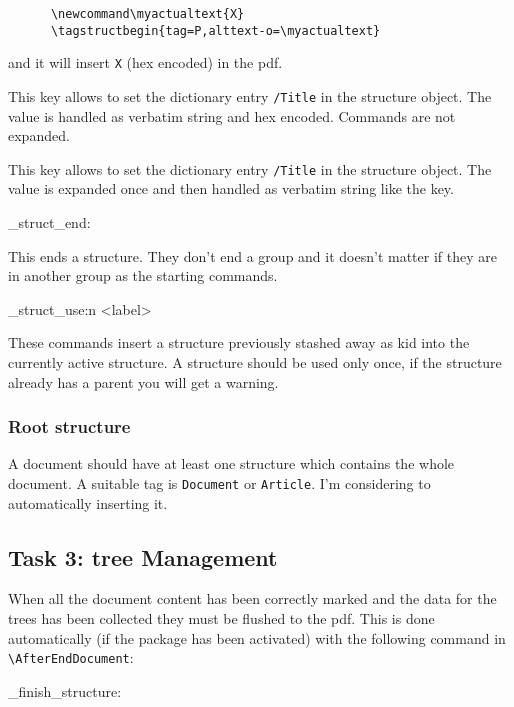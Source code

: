 \documentclass[DIV=12,parskip=half-,bibliography=totoc]{scrartcl}
\begin{document}
\begin{description}
      \begin{lstlisting}
      \newcommand\myactualtext{X}
      \tagstructbegin{tag=P,alttext-o=\myactualtext}
      \end{lstlisting}

      and it will insert \verb+X+ (hex encoded)  in the pdf.
  \item[\PrintKeyName{title}] This key allows to set the dictionary entry \texttt{/Title} in the structure object.
      The value is handled as verbatim string and hex encoded. Commands are not expanded.
  \item[\PrintKeyName{title-o}] This key allows to set the dictionary entry \texttt{/Title} in the structure object.
      The value is expanded once and then handled as verbatim string like the  key.
 \end{description}


\ExplSyntaxOn
\DescribeMacro\tagstructend
\DescribeMacro\uftag_struct_end:
\ExplSyntaxOff

This ends a structure. They don't end a group and it doesn't matter if they are in another group as the starting commands.

\ExplSyntaxOn
\DescribeMacro{}
\DescribeMacro\uftag_struct_use:n {<label>}
\ExplSyntaxOff

These commands insert a structure previously stashed away as kid into the currently active structure. A structure should be used only once, if the structure already has a parent you will get a warning.

\subsubsection{Root structure}

A document should have at least one structure which contains the whole document. A suitable tag is \texttt{Document} or \texttt{Article}. I'm considering to automatically inserting it.


\subsection{Task 3: tree Management}
When all the document content has been correctly marked and the data for the trees has been collected they must be flushed to the pdf. This is done automatically (if the package has been activated) with the following command in \verb+\AfterEndDocument+:

\ExplSyntaxOn
\DescribeMacro\uftag_finish_structure:
\ExplSyntaxOff
\end{document}
